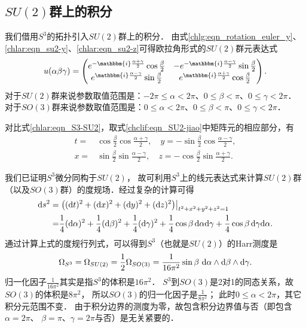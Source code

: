 \subsection{$SU(2)$群上的积分}

我们借用$S^3$的拓扑引入$SU(2)$群上的积分．
由式\eqref{chlg:eqn_rotation_euler_y}、\eqref{chlar:eqn_su2-y}、\eqref{chlar:eqn_su2-z}可得欧拉角形式的$SU(2)$群元表达式
\begin{equation}\label{chclif:eqn_SU2-jiao}
	u(\alpha\beta\gamma) = \begin{pmatrix}
		e^{-\mathbbm{i}\frac{\alpha+\gamma}{2} } \cos \frac{\beta}{2} & -e^{-\mathbbm{i} \frac{\alpha-\gamma}{2}}\sin\frac{\beta}{2} \\
		e^{\mathbbm{i} \frac{\alpha-\gamma}{2}}\sin\frac{\beta}{2} & e^{\mathbbm{i}\frac{\alpha+\gamma}{2} } \cos \frac{\beta}{2} 
	\end{pmatrix}.
\end{equation}
对于$SU(2)$群来说参数取值范围是：$-2\pi\leqslant \alpha < 2\pi$、$0\leqslant \beta < \pi$、$0\leqslant \gamma < 2\pi$．
对于$SO(3)$群来说参数取值范围是：$0 \leqslant \alpha < 2\pi$、$0\leqslant \beta < \pi$、$0\leqslant \gamma < 2\pi$．

对比式\eqref{chlar:eqn_S3-SU2}，取式\eqref{chclif:eqn_SU2-jiao}中矩阵元的相应部分，有
\begin{equation}
	\begin{aligned}
		t=&\cos \frac{\beta }{2} \cos \frac{\alpha +\gamma }{2}, \quad
		y=-\sin \frac{\beta }{2} \cos \frac{\alpha -\gamma }{2}, \\
		x=&\sin \frac{\beta }{2} \sin \frac{\alpha -\gamma }{2}, \quad 
		z=-\cos \frac{\beta }{2} \sin \frac{\alpha +\gamma }{2}.
	\end{aligned}
\end{equation}

我们已证明$S^3$微分同构于$SU(2)$，
故可利用$S^3$上的线元表达式来计算$SU(2)$群（以及$SO(3)$群）的度规场．经过复杂的计算可得
\begin{align}
	{\rm d} s^2 =& \left.\left(({\rm d} t)^2 + ({\rm d} x)^2 + ({\rm d} y)^2 + ({\rm d} z)^2
	\right)\right|_{t^2+x^2+y^2+z^2=1}  \notag \\
	=& \frac{1}{4} ({\rm d} \alpha)^2 + \frac{1}{4} ( {\rm d} \beta)^2 + \frac{1}{4} ( {\rm d} \gamma)^2 
	+ \frac{1}{4}\cos\beta \, {\rm d} \alpha {\rm d} \gamma + \frac{1}{4}\cos\beta \, 
	{\rm d} \gamma {\rm d} \alpha  .  \label{chlar:eqn_S3-metric}
\end{align}
通过计算上式的度规行列式，可以得到$S^3$（也就是$SU(2)$）的Harr测度是
\begin{equation}\label{chlar:eqn_Harr-S3-Euler}
	\Omega_{S^3} =\Omega_{SU(2)} = \frac{1}{2}\Omega_{SO(3)}
	= \frac{1}{16 \pi^2} \sin\beta \  {\rm d} \alpha \wedge {\rm d} \beta \wedge  {\rm d} \gamma .
\end{equation}%
归一化因子$\frac{1}{16 \pi^2}$其实是指$S^3$的体积是$16 \pi^2$．
$S^3$到$SO(3)$是2对1的同态关系，故$SO(3)$的体积是$8\pi^2$，
所以$SO(3)$的归一化因子是$\frac{1}{8 \pi^2}$；
此时$0 \leqslant \alpha < 2\pi$，其它积分元范围不变．
由于积分边界的测度为零，故包含积分边界值与否（即包含$\alpha=2\pi$、
$\beta=\pi$、$\gamma=2\pi$与否）是无关紧要的．


